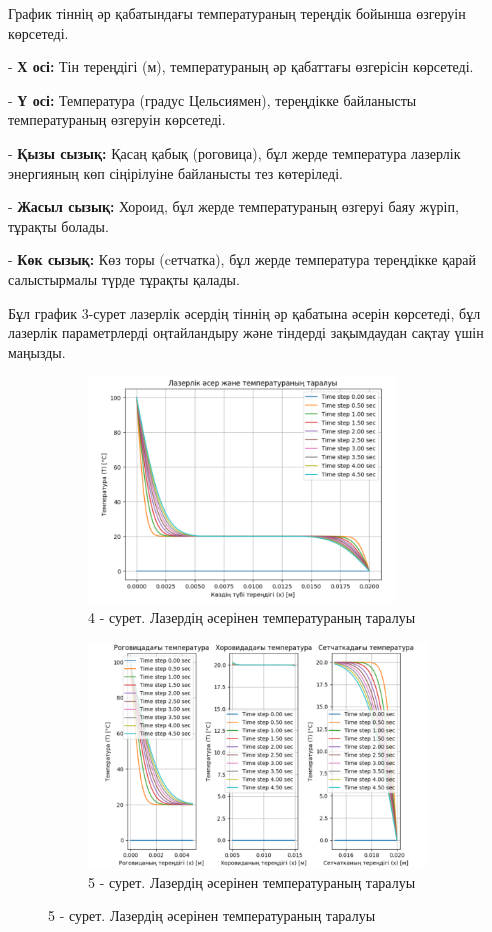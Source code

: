 \begin{multicols}{2}
График тіннің әр қабатындағы температураның тереңдік бойынша өзгеруін
көрсетеді.

- {\bfseries Х осі:} Тін тереңдігі (м), температураның әр қабаттағы
өзгерісін көрсетеді.

- {\bfseries Ү осі:} Температура (градус Цельсиямен), тереңдікке байланысты
температураның өзгеруін көрсетеді.

- {\bfseries Қызы сызық:} Қасаң қабық (роговица), бұл жерде температура
лазерлік энергияның көп сіңірілуіне байланысты тез көтеріледі.

- {\bfseries Жасыл сызық:} Хороид, бұл жерде температураның өзгеруі баяу
жүріп, тұрақты болады.

- {\bfseries Көк сызық:} Көз торы (cетчатка), бұл жерде температура
тереңдікке қарай салыстырмалы түрде тұрақты қалады.

Бұл график 3-сурет лазерлік әсердің тіннің әр қабатына әсерін көрсетеді,
бұл лазерлік параметрлерді оңтайландыру және тіндерді зақымдаудан сақтау
үшін маңызды.
\end{multicols}

\begin{figure}[H]
	\centering
	\begin{subfigure}[b]{0.45\textwidth}
		\centering
		\includegraphics[height=6cm]{media/ict/image23}
		\caption*{4 - сурет. Лазердің әсерінен температураның таралуы}
	\end{subfigure}
	\begin{subfigure}[b]{0.45\textwidth}
		\centering
		\includegraphics[height=6cm]{media/ict/image24}
		\caption*{5 - сурет. Лазердің әсерінен температураның таралуы}
	\end{subfigure}
\end{figure}

